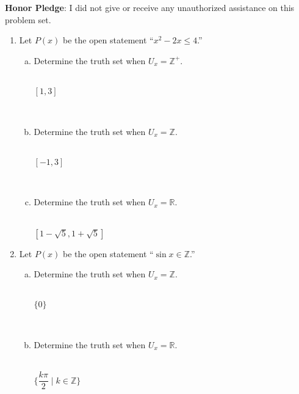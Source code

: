 \documentclass[12pt]{amsart}
\begin{document}
\vfill
\noindent
\textbf{Honor Pledge}: I did not give or receive any unauthorized assistance on this problem set.

\vspace{0.5in}
\hfill\makebox[3.0in]{\hrulefill}

\hfill{}

\newpage
\begin{enumerate}[{\bfseries 1.}]
\item Let $P(x)$ be the open statement ``$x^{2}-2x\leq 4$.''
	\begin{enumerate}[(a)]
	\vspace{0.1in}
	\item Determine the truth set when $U_{x}=\mathbb{Z}^{+}$.
	\begin{normalize}
	    \vspace{0.1in}
        \\$[1, 3]$\tab
    \end{normalize}
    \\
	\item Determine the truth set when $U_{x}=\mathbb{Z}$.
	\begin{normalize}
	    \vspace{0.1in}
        \\$[-1, 3]$\tab
    \end{normalize}
    \\
	\item Determine the truth set when $U_{x}=\mathbb{R}$.
	\begin{normalize}
	    \vspace{0.1in}
        \\$[1-\sqrt{5}, 1+\sqrt{5}]$\tab
    \end{normalize}
	\end{enumerate}
\vspace{0.2in}
\item Let $P(x)$ be the open statement ``$\sin{x}\in\mathbb{Z}$.''
	\begin{enumerate}[(a)]
	\vspace{0.1in}
	\item Determine the truth set when $U_{x}=\mathbb{Z}$.
	\begin{normalize}
	    \vspace{0.1in}
        \\$\{0\}$\tab
    \end{normalize}
    \\
	\item Determine the truth set when $U_{x}=\mathbb{R}$.
	\begin{normalize}
	    \vspace{0.1in}
        \\$\{\dfrac{k\pi}{2} \mid k\in \mathbb{Z}\}$\tab
    \end{normalize}
    \\
	\end{enumerate}
\end{enumerate}
\vfill
\end{document}
